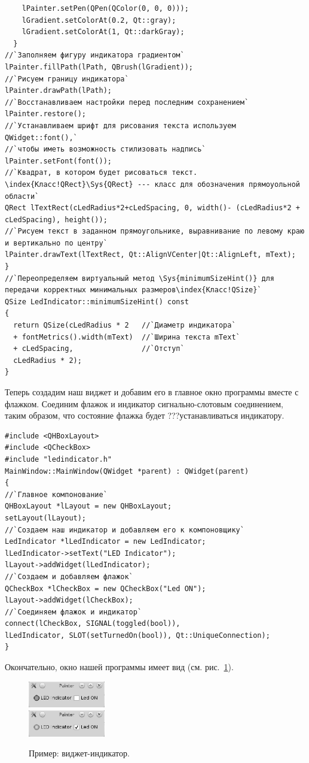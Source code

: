 \begin{lstlisting}
    lPainter.setPen(QPen(QColor(0, 0, 0)));
    lGradient.setColorAt(0.2, Qt::gray);
    lGradient.setColorAt(1, Qt::darkGray);
  }
//`Заполняем фигуру индикатора градиентом`
lPainter.fillPath(lPath, QBrush(lGradient));
//`Рисуем границу индикатора`
lPainter.drawPath(lPath);
//`Восстанавливаем настройки перед последним сохранением`
lPainter.restore();
//`Устанавливаем шрифт для рисования текста используем QWidget::font(),` 
//`чтобы иметь возможность стилизовать надпись`
lPainter.setFont(font());
//`Квадрат, в котором будет рисоваться текст. \index{Класс!QRect}\Sys{QRect} --- класс для обозначения прямоуольной области`
QRect lTextRect(cLedRadius*2+cLedSpacing, 0, width()- (cLedRadius*2 + cLedSpacing), height());
//`Рисуем текст в заданном прямоугольнике, выравнивание по левому краю и вертикально по центру`
lPainter.drawText(lTextRect, Qt::AlignVCenter|Qt::AlignLeft, mText);
}
//`Переопределяем виртуальный метод \Sys{minimumSizeHint()} для передачи корректных минимальных размеров\index{Класс!QSize}`
QSize LedIndicator::minimumSizeHint() const
{
  return QSize(cLedRadius * 2   //`Диаметр индикатора`
  + fontMetrics().width(mText)  //`Ширина текста mText`
  + cLedSpacing,                //`Отступ`
  cLedRadius * 2);
}
\end{lstlisting}

Теперь создадим наш виджет и добавим его в главное окно программы вместе с флажком. Соединим флажок и индикатор
сигнально-слотовым соединением, таким образом, что состояние флажка будет ???устанавливаться индикатору.
\begin{lstlisting}
#include <QHBoxLayout>
#include <QCheckBox>
#include "ledindicator.h"
MainWindow::MainWindow(QWidget *parent) : QWidget(parent)
{
//`Главное компонование`
QHBoxLayout *lLayout = new QHBoxLayout;
setLayout(lLayout);
//`Создаем наш индикатор и добавляем его к компоновщику`
LedIndicator *lLedIndicator = new LedIndicator;
lLedIndicator->setText("LED Indicator");
lLayout->addWidget(lLedIndicator);
//`Создаем и добавляем флажок`
QCheckBox *lCheckBox = new QCheckBox("Led ON");
lLayout->addWidget(lCheckBox);
//`Соединяем флажок и индикатор`
connect(lCheckBox, SIGNAL(toggled(bool)),
lLedIndicator, SLOT(setTurnedOn(bool)), Qt::UniqueConnection);
}
\end{lstlisting}

Окончательно, окно нашей программы имеет вид (см. рис.~\ref{ch14:refDrawing2}).

\begin{figure}[htb]
\begin{center}
\includegraphics[width=0.3\textwidth]{img/ris_14_3a}\\
\includegraphics[width=0.3\textwidth]{img/ris_14_3b}
\caption[Пример: виджет-индикатор.]{Пример: виджет-индикатор.}
\label{ch14:refDrawing2}
\end{center}
\end{figure}

